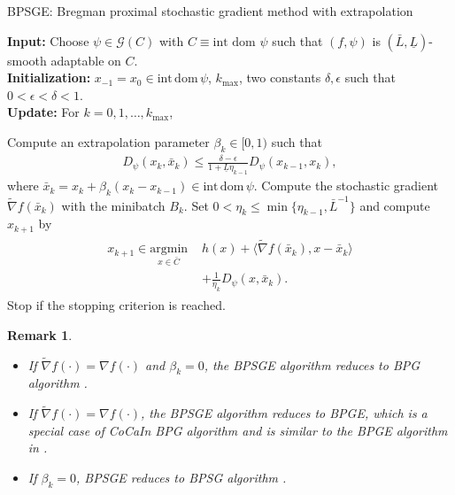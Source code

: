 \documentclass[letterpaper]{article} %
\newtheorem{remark}{Remark}
\newcommand{\red}[1]{\begin{color}{red}#1\end{color}}
\begin{document}
	\begin{algorithm}[t]
		\caption{BPSGE: Bregman proximal stochastic gradient method with extrapolation}
		\label{BPSGE}
		{\bfseries Input:}  Choose $\psi\in\mathcal{G}(C)$ with $C\equiv\text{int dom }\psi$ such that $(f,\psi)$ is $(\bar{L},\underline{L})$-smooth adaptable  on $C$.\\
		{\bfseries Initialization:} $x_{-1}=x_{0}\in\mathrm{int}\,\mathrm{dom}\,\psi$, $k_{\max}$, two constants $\delta,\epsilon$ such that $0<\epsilon<\delta<1$. \\
		{\bfseries Update:}
		For $k=0,1,\dots,k_{\max}$,
		\begin{algorithmic}[1]
			\STATE Compute an extrapolation parameter $\beta_{k}\in[0,1)$ such that
			\begin{eqnarray}
				D_{\psi}(x_{k},\bar{x}_{k})\le \frac{\delta-\epsilon} {1+\underline{L}\eta_{k-1}}D_{\psi}(x_{k-1},x_{k}), \label{extra_ineq}
			\end{eqnarray}
			where  $\bar{x}_{k}=x_{k}+\beta_{k}(x_{k}-x_{k-1})\in\mathrm{int}\,\mathrm{dom}\, \psi$.
			\STATE Compute the stochastic gradient $\tilde{\nabla}f(\bar{x}_{k})$ with the minibatch  $B_{k}$.
			\STATE Set $0<\eta_{k}\le\min\{\eta_{k-1},\bar{L}^{-1}\}$ and compute $x_{k+1}$ by
			\begin{eqnarray}
				\begin{aligned}
					x_{k+1}\in\underset{x\in\bar{C}}{\text{argmin}}\,\, &h(x)+\langle \tilde{\nabla}f(\bar{x}_{k}),x-\bar{x}_{k}\rangle\\
					&+\frac{1}{\eta_{k}}D_{\psi}(x,\bar{x}_{k}).
				\end{aligned}\label{xk_update}
			\end{eqnarray}
			\STATE Stop if the stopping criterion is reached.
		\end{algorithmic}
	\end{algorithm}

	\begin{remark}
		\begin{itemize}
			\item If $\tilde{\nabla}f(\cdot)=\nabla f(\cdot)$ and $\beta_{k}=0$, the BPSGE algorithm reduces to BPG algorithm \cite{BolteSTV18First}.
			\item If $\tilde{\nabla}f(\cdot)=\nabla f(\cdot)$, the BPSGE algorithm reduces to BPGE, which is a special case of CoCaIn BPG algorithm \cite{MukkamalaOPS20}   and is similar to the BPGE algorithm in  \cite{ZhangBM0C19}.
			\item If  $\beta_{k}=0$, BPSGE reduces to BPSG algorithm \cite{WangH23}.
		\end{itemize}
	\end{remark}
\end{document}
